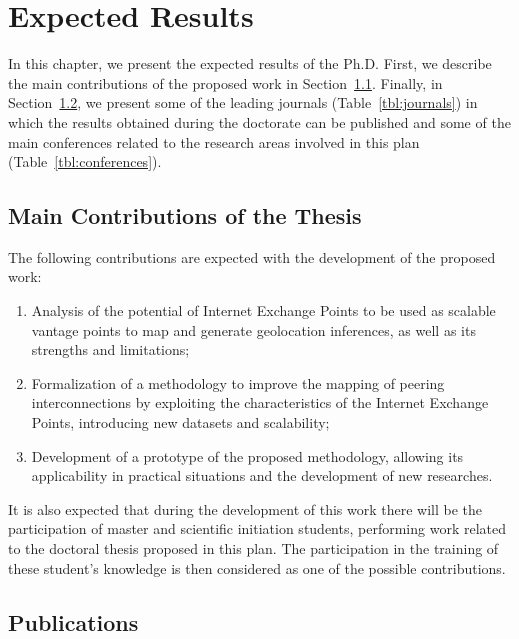 \chapter{Expected Results}\label{cap:expected-results}
\thispagestyle{empty}

	In this chapter, we present the expected results of the Ph.D. First, we describe the main contributions of the proposed work in Section~\ref{sec:contributions}. Finally, in Section~\ref{sec:publications}, we present some of the leading journals (Table~\ref{tbl:journals}) in which the results obtained during the doctorate can be published and some of the main conferences related to the research areas involved in this plan (Table~\ref{tbl:conferences}).

	\section{Main Contributions of the Thesis}\label{sec:contributions}
	\thispagestyle{empty}

	The following contributions are expected with the development of the proposed work:

	\begin{enumerate}
    \item Analysis of the potential of Internet Exchange Points to be used as scalable vantage points to map and generate geolocation inferences, as well as its strengths and limitations;

    \item Formalization of a methodology to improve the mapping of peering interconnections by exploiting the characteristics of the Internet Exchange Points, introducing new datasets and scalability;

    \item Development of a prototype of the proposed methodology, allowing its applicability in practical situations and the development of new researches.
    \end{enumerate}

	It is also expected that during the development of this work there will be the participation of master and scientific initiation students, performing work related to the doctoral thesis proposed in this plan. The participation in the training of these student's knowledge is then considered as one of the possible contributions.

	\section{Publications}
	\label{sec:publications}

